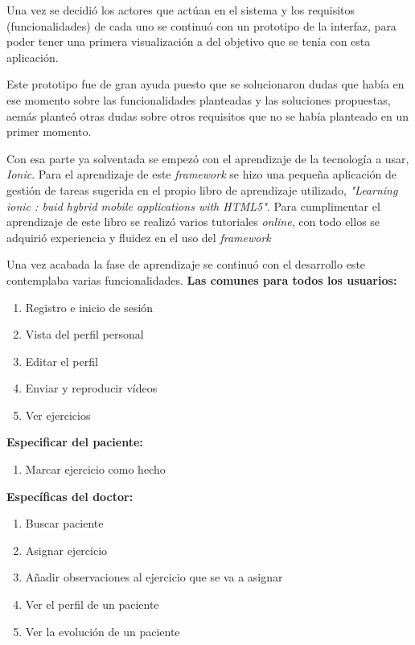 \medskip
Una vez se decidió los actores que actúan en el sistema y los requisitos (funcionalidades) de cada uno
se continuó con un prototipo de la interfaz, para poder tener una primera visualización a del objetivo
que se tenía con esta aplicación.

\medskip
Este prototipo fue de gran ayuda puesto que se solucionaron dudas que había en ese momento sobre
las funcionalidades planteadas y las soluciones propuestas, aemás planteó otras dudas sobre otros requisitos
que no se había planteado en un primer momento.

\medskip
Con esa parte ya solventada se empezó con el aprendizaje de la tecnología a usar, \textit{Ionic}\cite{ionic}.
Para el aprendizaje de este \textit{framework} se hizo una pequeña aplicación de gestión de tareas
sugerida en el propio libro de aprendizaje utilizado, \textit{"Learning ionic : buid hybrid mobile
applications with HTML5"}\cite{ionic-book}. Para cumplimentar el aprendizaje de este libro se realizó
varios tutoriales \textit{online}, con todo ellos se adquirió experiencia y fluidez en el uso del
\textit{framework}

\medskip
Una vez acabada la fase de aprendizaje se continuó con el desarrollo este contemplaba varias funcionalidades.
\textbf{Las comunes para todos los usuarios:}
\begin{enumerate}
    \item Registro e inicio de sesión
    \item Vista del perfil personal
    \item Editar el perfil
    \item Enviar y reproducir vídeos
    \item Ver ejercicios
\end{enumerate}

\medskip
\textbf{Especificar del paciente:}
\begin{enumerate}
    \item Marcar ejercicio como hecho
\end{enumerate}

\medskip
\textbf{Específicas del doctor:}
\begin{enumerate}
    \item Buscar paciente
    \item Asignar ejercicio
    \item Añadir observaciones al ejercicio que se va a asignar
    \item Ver el perfil de un paciente
    \item Ver la evolución de un paciente
\end{enumerate}

